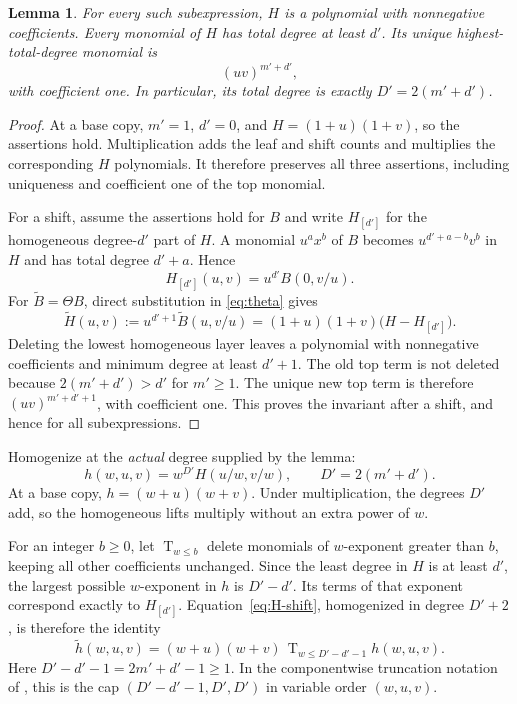 \documentclass[11pt,letterpaper]{article}
\newtheorem{lemma}[theorem]{Lemma}
\theoremstyle{definition}
\theoremstyle{remark}
\newcommand{\Tr}{\operatorname{T}}
\begin{document}
\begin{lemma}\label{lem:invariant}
For every such subexpression, $H$ is a polynomial with nonnegative coefficients. Every monomial of $H$ has total degree at least $d'$. Its unique highest-total-degree monomial is
\[
 (uv)^{m'+d'},
\]
with coefficient one. In particular, its total degree is exactly $D'=2(m'+d')$.
\end{lemma}
\begin{proof}
At a base copy, $m'=1$, $d'=0$, and $H=(1+u)(1+v)$, so the assertions hold. Multiplication adds the leaf and shift counts and multiplies the corresponding $H$ polynomials. It therefore preserves all three assertions, including uniqueness and coefficient one of the top monomial.

For a shift, assume the assertions hold for $B$ and write $H_{[d']}$ for the homogeneous degree-$d'$ part of $H$. A monomial $u^a x^b$ of $B$ becomes $u^{d'+a-b}v^b$ in $H$ and has total degree $d'+a$. Hence
\begin{equation}\label{eq:low-layer}
 H_{[d']}(u,v)=u^{d'}B(0,v/u).
\end{equation}
For $\widetilde B=\Theta B$, direct substitution in \eqref{eq:theta} gives
\begin{equation}\label{eq:H-shift}
 \widetilde H(u,v):=u^{d'+1}\widetilde B(u,v/u)
       =(1+u)(1+v)\bigl(H-H_{[d']}\bigr).
\end{equation}
Deleting the lowest homogeneous layer leaves a polynomial with nonnegative coefficients and minimum degree at least $d'+1$. The old top term is not deleted because $2(m'+d')>d'$ for $m'\geq1$. The unique new top term is therefore $(uv)^{m'+d'+1}$, with coefficient one. This proves the invariant after a shift, and hence for all subexpressions.
\end{proof}

Homogenize at the \emph{actual} degree supplied by the lemma:
\begin{equation}\label{eq:homogenize}
 h(w,u,v)=w^{D'}H(u/w,v/w),\qquad D'=2(m'+d').
\end{equation}
At a base copy, $h=(w+u)(w+v)$. Under multiplication, the degrees $D'$ add, so the homogeneous lifts multiply without an extra power of $w$.

For an integer $b\geq0$, let $\Tr_{w\leq b}$ delete monomials of $w$-exponent greater than $b$, keeping all other coefficients unchanged. Since the least degree in $H$ is at least $d'$, the largest possible $w$-exponent in $h$ is $D'-d'$. Its terms of that exponent correspond exactly to $H_{[d']}$. Equation~\eqref{eq:H-shift}, homogenized in degree $D'+2$, is therefore the identity
\begin{equation}\label{eq:h-shift}
 \widetilde h(w,u,v)
   =(w+u)(w+v)\,
         \Tr_{w\leq D'-d'-1}h(w,u,v).
\end{equation}
Here $D'-d'-1=2m'+d'-1\geq1$. In the componentwise truncation notation of \cite[Definition 3.2]{RSW2025}, this is the cap $(D'-d'-1,D',D')$ in variable order $(w,u,v)$.
\end{document}
